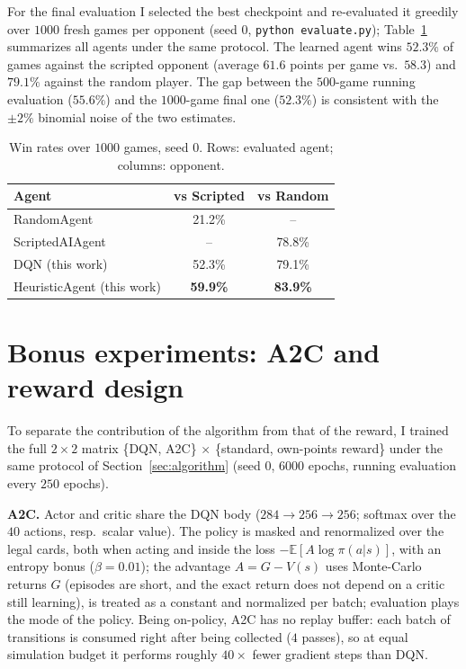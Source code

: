 \documentclass{article}
\begin{document}
For the final evaluation I selected the best checkpoint and re-evaluated it greedily over $1000$ fresh games per opponent (seed 0, \texttt{python evaluate.py}); Table~\ref{tab:results} summarizes all agents under the same protocol. The learned agent wins $\mathbf{52.3\%}$ of games against the scripted opponent (average $61.6$ points per game vs.\ $58.3$) and $79.1\%$ against the random player. The gap between the $500$-game running evaluation ($55.6\%$) and the $1000$-game final one ($52.3\%$) is consistent with the $\pm 2\%$ binomial noise of the two estimates.

\begin{table}[t]
\caption{Win rates over $1000$ games, seed 0. Rows: evaluated agent; columns: opponent.}
\label{tab:results}
\vskip 0.15in
\begin{center}
\begin{small}
\begin{sc}
\begin{tabular}{lcc}
\toprule
Agent & vs Scripted & vs Random \\
\midrule
RandomAgent     & 21.2\% & --     \\
ScriptedAIAgent & --     & 78.8\% \\
DQN (this work)      & 52.3\% & 79.1\% \\
HeuristicAgent (this work) & \textbf{59.9\%} & \textbf{83.9\%} \\
\bottomrule
\end{tabular}
\end{sc}
\end{small}
\end{center}
\vskip -0.1in
\end{table}

\section{Bonus experiments: A2C and reward design}
\label{sec:bonus}

To separate the contribution of the algorithm from that of the reward, I trained the full $2 \times 2$ matrix \{DQN, A2C\} $\times$ \{standard, own-points reward\} under the same protocol of Section~\ref{sec:algorithm} (seed 0, $6000$ epochs, running evaluation every $250$ epochs).

\textbf{A2C.} Actor and critic share the DQN body ($284 \to 256 \to 256$; softmax over the $40$ actions, resp.\ scalar value). The policy is masked and renormalized over the legal cards, both when acting and inside the loss $-\mathbb{E}[A \log \pi(a|s)]$, with an entropy bonus ($\beta = 0.01$); the advantage $A = G - V(s)$ uses Monte-Carlo returns $G$ (episodes are short, and the exact return does not depend on a critic still learning), is treated as a constant and normalized per batch; evaluation plays the mode of the policy. Being on-policy, A2C has no replay buffer: each batch of transitions is consumed right after being collected ($4$ passes), so at equal simulation budget it performs roughly $40\times$ fewer gradient steps than DQN.
\end{document}
